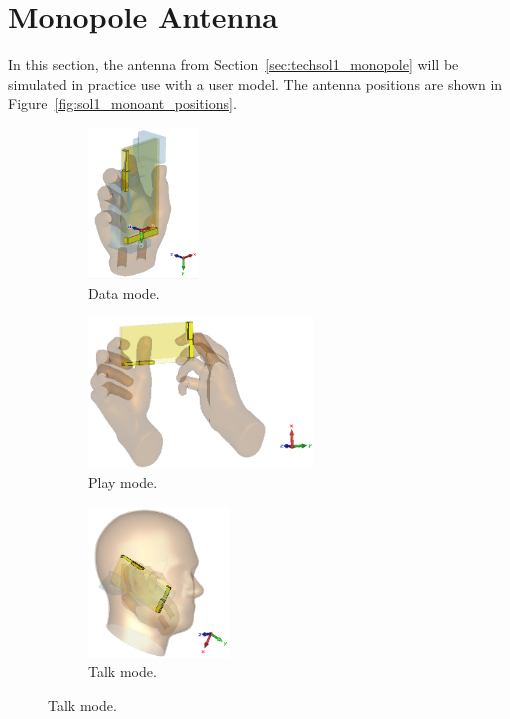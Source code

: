 \section{Monopole Antenna}
In this section, the antenna from Section~\ref{sec:techsol1_monopole} will be simulated in practice use with a user model. The antenna positions are shown in Figure~\ref{fig:sol1_monoant_positions}.

\begin{figure}[htbp]
    \centering
    \begin{subfigure}[b]{0.24\linewidth}
        \centering \includegraphics[width=\linewidth,height=4cm,keepaspectratio]{img/tech_sol/monopole/data_mode/3d_data_mode.PNG}
        \caption{Data mode.}
    \end{subfigure}
    \begin{subfigure}[b]{0.24\linewidth}
        \centering \includegraphics[width=\linewidth,height=4cm,keepaspectratio]{img/tech_sol/monopole/play_mode/3d_play_mode.PNG}
        \caption{Play mode.}
    \end{subfigure}
    \begin{subfigure}[b]{0.24\linewidth}
        \centering \includegraphics[width=\linewidth,height=4cm,keepaspectratio]{img/tech_sol/monopole/talk_mode/3d_talk_mode.PNG}
        \caption{Talk mode.}

\end{subfigure}
\end{figure}
